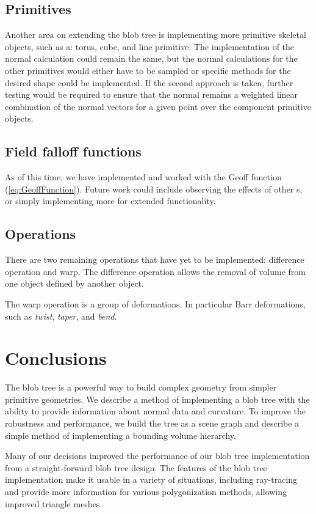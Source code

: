 \documentclass[conference]{acmsiggraph}
\begin{document}
\subsection{Primitives}
Another area on extending the blob tree is implementing more primitive skeletal
objects, such as a: torus, cube, and line primitive. The implementation of the
normal calculation could remain the same, but the normal calculations for the
other primitives would either have to be sampled\cite{Stam2011} or specific
methods for the desired shape could be implemented. If the second approach is
taken, further testing would be required to ensure that the normal remains a
weighted linear combination of the normal vectors for a given point over the
component primitive objects.

\subsection{Field falloff functions}
As of this time, we have implemented and worked with the Geoff
function (\ref{eq:GeoffFunction}). Future work could include observing the effects
of other \fff s, or simply implementing more for extended functionality.

\subsection{Operations}
There are two remaining operations that have yet to be implemented: difference
operation and warp. The difference operation allows the removal of volume from
one object defined by another object.

The warp operation is a group of deformations. In particular Barr deformations,
such as \textit{twist}, \textit{taper}, and \textit{bend}.

\section{Conclusions}
The blob tree is a powerful way to build complex geometry from simpler
primitive geometries. We describe a method of implementing a blob tree with the
ability to provide information about normal data and curvature. To improve the
robustness and performance, we build the tree as a scene graph and describe a
simple method of implementing a bounding volume hierarchy.

Many of our decisions improved the performance of our blob tree implementation
from a straight-forward blob tree design. The features of the blob tree
implementation make it usable in a variety of situations, including ray-tracing
and provide more information for various polygonization methods, allowing
improved triangle meshes.




\end{document}
